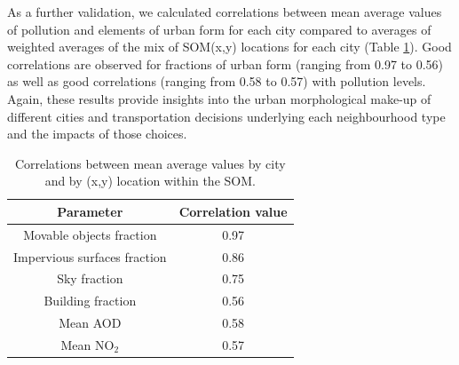 \documentclass[9pt,twocolumn,twoside,lineno]{pnas-new}
\begin{document}
As a further validation, we calculated correlations between mean average values of pollution and elements of urban form for each city compared to averages of weighted averages of the mix of SOM(x,y) locations for each city (Table \ref{table:correlations}). Good correlations are observed for fractions of urban form (ranging from 0.97 to 0.56) as well as good correlations (ranging from 0.58 to 0.57) with pollution levels. Again, these results provide insights into the urban morphological make-up of different cities and transportation decisions underlying each neighbourhood type and the impacts of those choices.

\begin{table}
\centering
\caption{Correlations between mean average values by city and by (x,y) location within the SOM.}\label{table:correlations}
\begin{tabular}{ | c | c |}
\hline \textbf{Parameter} & \textbf{Correlation value}\\ \hline
Movable objects fraction& 0.97 \\ \hline
Impervious surfaces fraction& 0.86 \\ \hline
Sky fraction& 0.75 \\ \hline
Building fraction& 0.56 \\ \hline
Mean AOD& 0.58 \\ \hline
Mean NO$_{2}$&0.57 \\ \hline
\end{tabular}
\end{table}






























%
%
%
%
%
%
% 
\end{document}

